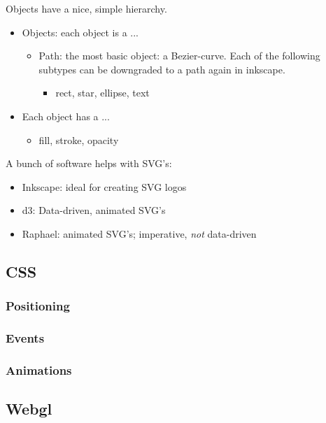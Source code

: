 Objects have a nice, simple hierarchy.
\begin{itemize}
    \item Objects: each object is a ...
        \begin{itemize}
            \item Path: the most basic object: a Bezier-curve. Each of the following subtypes can be downgraded to a path again in inkscape.
                \begin{itemize}
                    \item rect, star, ellipse, text
                \end{itemize}
        \end{itemize}
    \item Each object has a ... 
        \begin{itemize}
            \item fill, stroke, opacity
        \end{itemize}
\end{itemize}

A bunch of software helps with SVG's:
\begin{itemize}
    \item Inkscape: ideal for creating SVG logos
    \item d3: Data-driven, animated SVG's
    \item Raphael: animated SVG's; imperative, \emph{not} data-driven
\end{itemize}



\subsection{CSS}

\subsubsection{Positioning}
\subsubsection{Events}
\subsubsection{Animations}



\subsection{Webgl}

